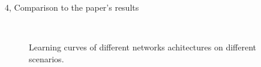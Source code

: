 \documentclass[10pt,a4paper]{article}
\begin{document}
\begin{task}{4, Comparison to the paper's results}
\begin{figure}[h]
    \centering
    \hfill
    \\
    \hfill
    \caption{Learning curves of different networks achitectures on different scenarios.}
    \label{fig:various-scenarios}
\end{figure}


\end{task}
\end{document}
